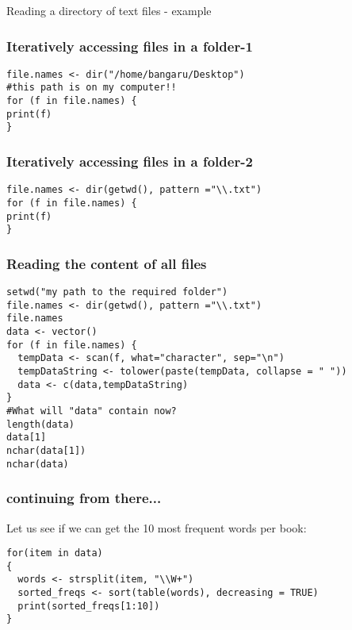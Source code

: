 \documentclass{beamer}
\begin{document}
\begin{frame}
\Large Reading a directory of text files - example
\end{frame}

\begin{frame}[fragile]
\frametitle{Iteratively accessing files in a folder-1}
\tiny
\begin{verbatim}
file.names <- dir("/home/bangaru/Desktop")
#this path is on my computer!!
for (f in file.names) {
print(f)
} 
\end{verbatim}
\end{frame}

\begin{frame}[fragile]
\frametitle{Iteratively accessing files in a folder-2}
\tiny
\begin{verbatim}
file.names <- dir(getwd(), pattern ="\\.txt")
for (f in file.names) {
print(f)
} 
\end{verbatim}
\end{frame}

\begin{frame}[fragile]
\frametitle{Reading the content of all files}
\tiny
\begin{verbatim}
setwd("my path to the required folder")
file.names <- dir(getwd(), pattern ="\\.txt")
file.names
data <- vector()
for (f in file.names) {
  tempData <- scan(f, what="character", sep="\n")
  tempDataString <- tolower(paste(tempData, collapse = " "))
  data <- c(data,tempDataString)
} 
#What will "data" contain now?
length(data)
data[1]
nchar(data[1])
nchar(data)
\end{verbatim}
\end{frame}


\begin{frame}[fragile]
\frametitle{continuing from there...}
Let us see if we can get the 10 most frequent words per book:
\tiny
\begin{verbatim}
for(item in data)
{
  words <- strsplit(item, "\\W+")
  sorted_freqs <- sort(table(words), decreasing = TRUE)
  print(sorted_freqs[1:10])
}
\end{verbatim}
\end{frame}
\end{document}
